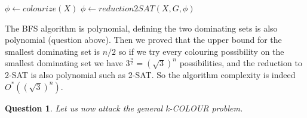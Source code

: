 \documentclass{article}
\newtheorem{Question}[theorem]{Question}
\begin{document}
\begin{enumerate}[(a)]
\begin{algorithm}[H]
\begin{algorithmic}
            \EndIf
            \State $\phi \gets colourize(X)$
            \State $\phi \gets reduction2SAT(X, G, \phi)$
        \end{algorithmic}
    \end{algorithm}
    The BFS algorithm is polynomial, defining the two dominating sets is also polynomial (question above). Then we proved that the upper bound for the smallest dominating set is $n/2$ so if we try every colouring possibility on the smallest dominating set we have $3^{\frac{n}{2}} = (\sqrt{3})^n$ possibilities, and the reduction to 2-SAT is also polynomial such as 2-SAT. So the algorithm complexity is indeed $O^*((\sqrt{3})^n)$.
\end{enumerate}
\begin{Question}
    Let us now attack the general k-COLOUR problem.
\end{Question}
\end{document}
